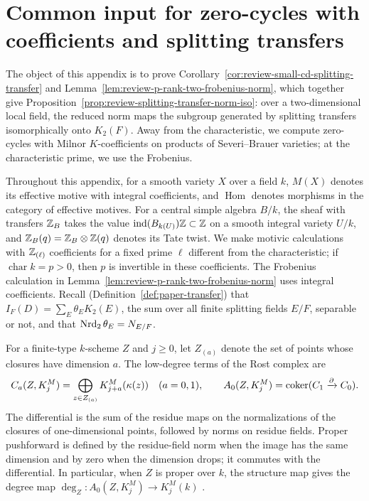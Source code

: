 \section{Common input for zero-cycles with coefficients and splitting transfers}\label{app:review-cycle-transfer}
The object of this appendix is to prove Corollary~\ref{cor:review-small-cd-splitting-transfer} and Lemma~\ref{lem:review-p-rank-two-frobenius-norm}, which together give Proposition~\ref{prop:review-splitting-transfer-norm-iso}: over a two-dimensional local field, the reduced norm maps the subgroup generated by splitting transfers isomorphically onto $K_2(F)$.
Away from the characteristic, we compute zero-cycles with Milnor $K$-coefficients on products of Severi--Brauer varieties; at the characteristic prime, we use the Frobenius.

Throughout this appendix, for a smooth variety $X$ over a field $k$, $M(X)$ denotes its effective motive with integral coefficients, and $\operatorname{Hom}$ denotes morphisms in the category of effective motives.
For a central simple algebra $B/k$, the sheaf with transfers $\mathbb Z_B$ takes the value $\operatorname{ind}(B_{k(U)})\mathbb Z\subset\mathbb Z$ on a smooth integral variety $U/k$, and $\mathbb Z_B(q)=\mathbb Z_B\otimes\mathbb Z(q)$ denotes its Tate twist.
We make motivic calculations with $\mathbb Z_{(\ell)}$ coefficients for a fixed prime $\ell$ different from the characteristic; if $\operatorname{char}k=p>0$, then $p$ is invertible in these coefficients.
The Frobenius calculation in Lemma~\ref{lem:review-p-rank-two-frobenius-norm} uses integral coefficients.
Recall (Definition~\ref{def:paper-transfer}) that $I_F(D)=\sum_E\theta_EK_2(E)$, the sum over all finite splitting fields $E/F$, separable or not, and that $\operatorname{Nrd}_2\theta_E=N_{E/F}$.

\begin{definition}\label{def:review-rost-zero-cycles}
For a finite-type $k$-scheme $Z$ and $j\ge0$, let $Z_{(a)}$ denote the set of points whose closures have dimension $a$.
The low-degree terms of the Rost complex are
\[
 C_a(Z,K_j^M)=\bigoplus_{z\in Z_{(a)}}K_{j+a}^M(\kappa(z))\quad(a=0,1),
 \qquad A_0(Z,K_j^M)=\operatorname{coker}(C_1\xrightarrow{\partial}C_0).
\]
The differential is the sum of the residue maps on the normalizations of the closures of one-dimensional points, followed by norms on residue fields.
Proper pushforward is defined by the residue-field norm when the image has the same dimension and by zero when the dimension drops; it commutes with the differential.
In particular, when $Z$ is proper over $k$, the structure map gives the degree map $\deg_Z:A_0(Z,K_j^M)\to K_j^M(k)$ \cite{Rost}.
\end{definition}


